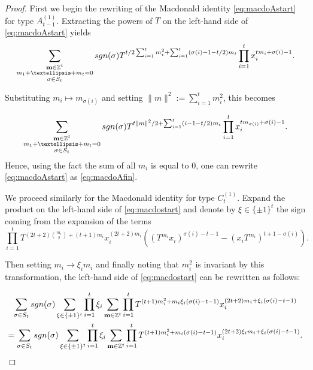 \documentclass[10pt,a4paper]{amsart}
\def\bbbz{\mathbb Z}
\def\det{{\rm det}}
\def\sgn{{\rm sgn}}
\begin{document}
\begin{proof}

\noindent First we begin the rewriting of the Macdonald identity \eqref{eq:macdoAstart} for type $A^{(1)}_{t-1}$. Extracting  the powers of $T$ on the left-hand side of \eqref{eq:macdoAstart} yields
$$
\sum_{\substack{\mathbf{m}\in\bbbz^t\\m_1+\dots+m_t=0\\\sigma\in S_t}}\sgn(\sigma)T^{t/2 \sum_{i=1}^tm_i^2+\sum_{i=1}^t(\sigma(i)-1-t/2)m_i}\prod_{i=1}^tx_i^{tm_i+\sigma(i)-1}.$$

Substituting $m_i\mapsto m_{\sigma(i)}$ and setting $\lVert m\rVert^2:=\sum_{i=1}^tm_i^2$, this becomes

$$
\sum_{\substack{\mathbf{m}\in\bbbz^t\\m_1+\dots+m_t=0\\\sigma\in S_t}}\sgn(\sigma)T^{t\lVert m\rVert^2/2+\sum_{i=1}^t(i-1-t/2)m_i}\prod_{i=1}^tx_i^{tm_{\sigma(i)}+\sigma(i)-1}.$$
\noindent Hence, using the fact the sum of all $m_i$ is equal to $0$, one can rewrite \eqref{eq:macdoAstart} as \eqref{eq:macdoAfin}.

We proceed similarly for the Macdonald identity for type $C^{(1)}_{t}$. Expand the product on the left-hand side of \eqref{eq:macdostart} and denote by $\xi\in\lbrace \pm 1\rbrace^t$ the sign coming from the expansion of the terms $$\prod_{i=1}^t T^{(2t+2)\binom{m_i}{2}+(t+1)m_i}x_i^{(2t+2)m_i}\left((T^{m_i}x_i)^{\sigma(i)-t-1}-(x_iT^{m_i})^{t+1-\sigma(i)}\right).$$

\noindent Then setting $m_i\to \xi_i m_i$ and finally noting that $m_i^2$ is invariant by this transformation, the left-hand side of \eqref{eq:macdostart} can be rewritten as follows:

\begin{multline*}
\sum_{\sigma\in S_t}\sgn(\sigma) \sum_{\xi\in\lbrace \pm 1\rbrace^t}\prod_{i=1}^t \xi_i \sum_{\mathbf{m}\in\bbbz^t}\prod_{i=1}^t T^{(t+1)m_i^2+m_i \xi_i(\sigma(i)-t-1)} x_i^{(2t+2)m_i+\xi_i(\sigma(i)-t-1)}\\
=\sum_{\sigma\in S_t}\sgn(\sigma) \sum_{\xi\in\lbrace \pm 1\rbrace^t}\prod_{i=1}^t \xi_i\sum_{\mathbf{m}\in\bbbz^t}\prod_{i=1}^t  T^{(t+1)m_i^2+m_i(\sigma(i)-t-1)} x_i^{(2t+2)\xi_im_i+\xi_i(\sigma(i)-t-1)}.
\end{multline*}


\end{proof}
\end{document}
